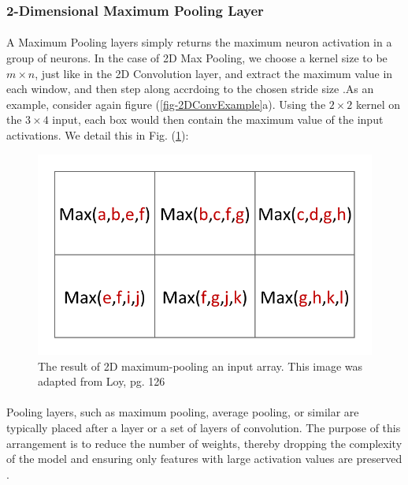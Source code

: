\documentclass[12pt,letterpaper]{article}
\begin{document}

\subsubsection{2-Dimensional Maximum Pooling Layer}
\label{subsubsec-2DPool}

\paragraph*{}A Maximum Pooling layers simply returns the maximum neuron activation in a group of neurons. In the case of 2D Max Pooling, we choose a kernel size to be $m \times n$, just like in the 2D Convolution layer, and extract the maximum value in each window, and then step along accrdoing to the chosen stride size \cite{Loy,Goodfellow}.As an example, consider again figure (\ref{fig-2DConvExample}a). Using the $2 \times 2$ kernel on the $3 \times 4$ input, each box would then contain the maximum value of the input activations. We detail this in Fig. (\ref{fig-2DMaxPool}):
\begin{figure}[h]
\label{fig-2DMaxPool}
\begin{center}
\includegraphics[scale=0.6]{../figures/2DConvExample(d)}
\end{center}
\caption{The result of 2D maximum-pooling an input array. This image was adapted from Loy, pg. 126 \cite{Loy}}
\end{figure} 

\paragraph*{}Pooling layers, such as maximum pooling, average pooling, or similar are typically placed after a layer or a set of layers of convolution. The purpose of this arrangement is to reduce the number of weights, thereby dropping the complexity of the model and ensuring only features with large activation values are preserved \cite{Geron,Loy,Goodfellow}.
\end{document}
